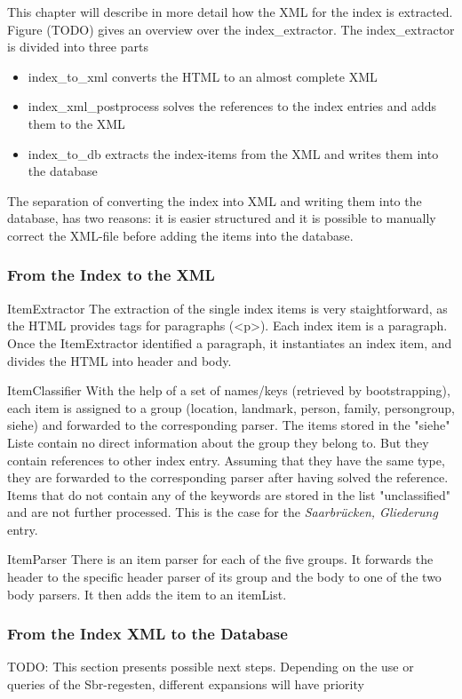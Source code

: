 This chapter will describe in more detail how the XML for the index is extracted. Figure (TODO) gives an overview over the index\_extractor.
The index\_extractor is divided into three parts

\begin{itemize}
\item index\_to\_xml converts the HTML to an almost complete XML
\item index\_xml\_postprocess solves the references to the index entries and adds them to the XML
\item index\_to\_db extracts the index-items from the XML and writes them into the database
\end{itemize}

The separation of converting the index into XML and writing them into the database, has two reasons: it is easier structured and it is possible to manually correct the XML-file before adding the items into the database.

\subsubsection{From the Index to the XML}
ItemExtractor
The extraction of the single index items is very staightforward, as the HTML provides tags for paragraphs (<p>). Each index item is a paragraph. Once the ItemExtractor identified a paragraph, it instantiates an index item, and divides the HTML into header and body.

ItemClassifier
With the help of a set of names/keys (retrieved by bootstrapping), each item is assigned to a group (location, landmark, person, family, persongroup, siehe) and forwarded to the corresponding parser. The items stored in the "siehe" Liste contain no direct information about the group they belong to. But they contain references to other index entry. Assuming that they have the same type, they are forwarded to the corresponding parser after having solved the reference. Items that do not contain any of the keywords are stored in the list "unclassified" and are not further processed. This is the case for the \textit{Saarbrücken, Gliederung} entry.

ItemParser
There is an item parser for each of the five groups. It forwards the header to the specific header parser of its group and the body to one of the two body parsers. It then adds the item to an itemList.


\subsubsection{From the Index XML to the Database}
TODO: This section presents possible next steps. Depending on the use or queries of the Sbr-regesten, different expansions will have priority

